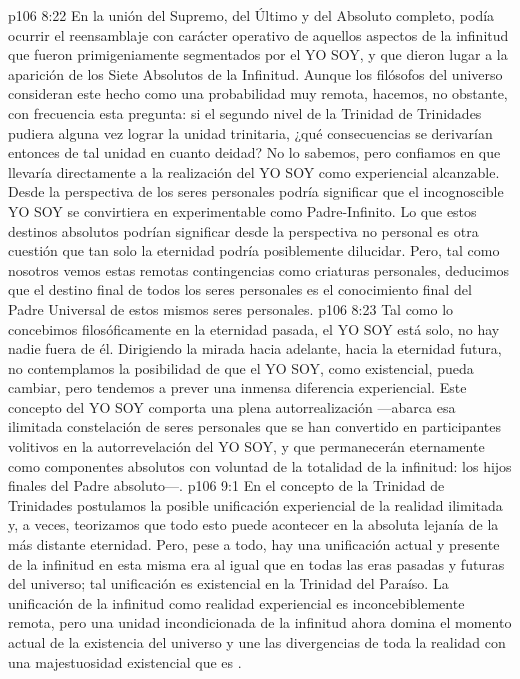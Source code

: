 \vs p106 8:22 En la unión del Supremo, del Último y del Absoluto completo, podía ocurrir el reensamblaje con carácter operativo de aquellos aspectos de la infinitud que fueron primigeniamente segmentados por el YO SOY, y que dieron lugar a la aparición de los Siete Absolutos de la Infinitud. Aunque los filósofos del universo consideran este hecho como una probabilidad muy remota, hacemos, no obstante, con frecuencia esta pregunta: si el segundo nivel de la Trinidad de Trinidades pudiera alguna vez lograr la unidad trinitaria, ¿qué consecuencias se derivarían entonces de tal unidad en cuanto deidad? No lo sabemos, pero confiamos en que llevaría directamente a la realización del YO SOY como experiencial alcanzable. Desde la perspectiva de los seres personales podría significar que el incognoscible YO SOY se convirtiera en experimentable como Padre\hyp{}Infinito. Lo que estos destinos absolutos podrían significar desde la perspectiva no personal es otra cuestión que tan solo la eternidad podría posiblemente dilucidar. Pero, tal como nosotros vemos estas remotas contingencias como criaturas personales, deducimos que el destino final de todos los seres personales es el conocimiento final del Padre Universal de estos mismos seres personales.
\vs p106 8:23 Tal como lo concebimos filosóficamente en la eternidad pasada, el YO SOY está solo, no hay nadie fuera de él. Dirigiendo la mirada hacia adelante, hacia la eternidad futura, no contemplamos la posibilidad de que el YO SOY, como existencial, pueda cambiar, pero tendemos a prever una inmensa diferencia experiencial. Este concepto del YO SOY comporta una plena autorrealización ---abarca esa ilimitada constelación de seres personales que se han convertido en participantes volitivos en la autorrevelación del YO SOY, y que permanecerán eternamente como componentes absolutos con voluntad de la totalidad de la infinitud: los hijos finales del Padre absoluto---.
\vs p106 9:1 En el concepto de la Trinidad de Trinidades postulamos la posible unificación experiencial de la realidad ilimitada y, a veces, teorizamos que todo esto puede acontecer en la absoluta lejanía de la más distante eternidad. Pero, pese a todo, hay una unificación actual y presente de la infinitud en esta misma era al igual que en todas las eras pasadas y futuras del universo; tal unificación es existencial en la Trinidad del Paraíso. La unificación de la infinitud como realidad experiencial es inconcebiblemente remota, pero una unidad incondicionada de la infinitud ahora domina el momento actual de la existencia del universo y une las divergencias de toda la realidad con una majestuosidad existencial que es .
